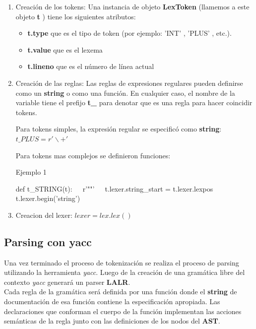 \documentclass[a4paper,10pt,twocolumn]{article}
\begin{document}
\begin{enumerate}
	\item Creación de los tokens: 
	Una instancia de objeto \textbf{LexToken} (llamemos a este objeto \textbf{t} ) tiene los siguientes atributos:
	\begin{itemize}
		\item \textbf{t.type} que es el tipo de token (por ejemplo: 'INT' , 'PLUS' , etc.).
		\item \textbf{t.value} que es el lexema
		\item \textbf{t.lineno} que es el número de línea actual
	\end{itemize} 

	\item Creación de las reglas: Las reglas de expresiones regulares pueden definirse como un \textbf{string} o como una función. En cualquier caso, el nombre de la variable tiene el prefijo \textbf{t\_} para denotar que es una regla para hacer coincidir tokens.
	
	Para tokens simples, la expresión regular se especificó como \textbf{string}: $t\_PLUS = r'\backslash+'$
	
	Para tokens mas complejos se definieron funciones:
	
	\begin{algorithm}
		\caption{Ejemplo 1}
		\begin{algorithmic}
			\STATE def t\_STRING(t):
			\STATE $\;\;\; $ r'""'
			\STATE $\;\;\; $ t.lexer.string\_start = t.lexer.lexpos
			\STATE $\;\;\; $ t.lexer.begin('string')
		\end{algorithmic}
	\end{algorithm}
	\item Creacion del lexer: $ lexer = lex.lex()$
\end{enumerate}

\subsection{Parsing con yacc}

Una vez terminado el proceso de tokenización se realiza el proceso de parsing utilizando la herramienta \textit{yacc}. Luego de la creación de una gramática libre del contexto \textit{yacc} generará un parser \textbf{LALR}.\\

Cada regla de la gramática será definida por una función donde el \textbf{string} de documentación de esa función contiene la especificación apropiada. Las declaraciones que conforman el cuerpo de la función implementan las acciones semánticas de la regla junto con las definiciones de los nodos del \textbf{AST}.
\end{document}
